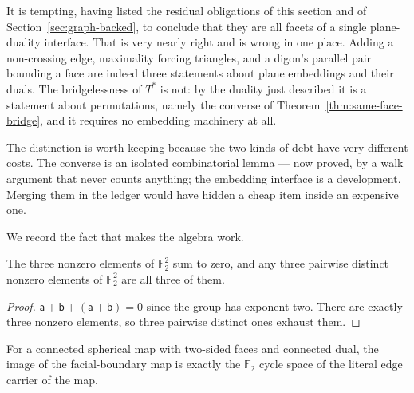 \begin{remark}\label{rem:not-one-interface}
\Sprose
It is tempting, having listed the residual obligations of this section and
of Section~\ref{sec:graph-backed}, to conclude that they are all facets of a
single plane-duality interface. That is very nearly right and is wrong in
one place. Adding a non-crossing edge, maximality forcing triangles, and a
digon's parallel pair bounding a face are indeed three statements about
plane embeddings and their duals. The bridgelessness of $T^{*}$ is not: by
the duality just described it is a statement about permutations, namely the
converse of Theorem~\ref{thm:same-face-bridge}, and it requires no embedding
machinery at all.

The distinction is worth keeping because the two kinds of debt have very
different costs. The converse is an isolated combinatorial lemma --- now proved, by a walk
argument that never counts anything; the embedding interface is a
development.
Merging them in the ledger would have hidden a cheap item inside an
expensive one.
\end{remark}

We record the fact that makes the algebra work.

\begin{lemma}\label{lem:klein}
The three nonzero elements of $\mathbb{F}_2^2$ sum to zero, and any three
pairwise distinct nonzero elements of $\mathbb{F}_2^2$ are all three of them.
\end{lemma}

\begin{proof}
$\mathsf a + \mathsf b + (\mathsf a + \mathsf b) = 0$ since the group has
exponent two. There are exactly three nonzero elements, so three pairwise
distinct ones exhaust them.
\end{proof}

\begin{theorem}\label{thm:cycle-space}
For a connected spherical map with two-sided faces and connected dual, the
image of the facial-boundary map is exactly the $\mathbb{F}_2$ cycle space of
the literal edge carrier of the map.
\end{theorem}

